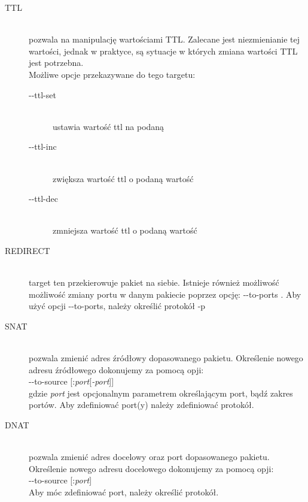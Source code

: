 \begin{description}
			\item[TTL] \hfill \\
				pozwala na manipulację wartościami TTL. Zalecane jest niezmienianie tej wartości, jednak w praktyce, są sytuacje w których zmiana wartości TTL jest potrzebna.\\
				Możliwe opcje przekazywane do tego targetu:
				\begin{description}
					\item[-{}-ttl-set ] \hfill \\
						ustawia wartość ttl na podaną
					\item[-{}-ttl-inc ] \hfill \\
						zwiększa wartość ttl o podaną wartość
					\item[-{}-ttl-dec ] \hfill \\
						zmniejsza wartość ttl o podaną wartość
				\end{description}
			\item[REDIRECT] \hfill \\
				target ten przekierowuje pakiet na siebie. Istnieje również możliwość możliwość zmiany portu w danym pakiecie poprzez opcję: -{}-to-ports .
				Aby użyć opcji -{}-to-ports, należy określić protokół -p 
			\item[SNAT] \hfill \\
				pozwala zmienić adres źródłowy dopasowanego pakietu. Określenie nowego adresu źródłowego dokonujemy za pomocą opji:\\
				-{}-to-source  [:\textit{port}[\textit{-port}]]\\
				gdzie \textit{port} jest opcjonalnym parametrem określającym port, bądź zakres portów. Aby zdefiniować port(y) należy zdefiniować protokół.
			\item[DNAT] \hfill \\
				pozwala zmienić adres docelowy oraz port dopasowanego pakietu. Określenie nowego adresu docelowego dokonujemy za pomocą opji:\\
				-{}-to-source  [:\textit{port}]\\
				Aby móc zdefiniować port, należy określić protokół.
		\end{description}

